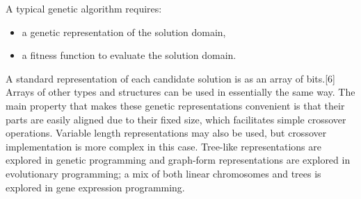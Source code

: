 \documentclass[a4paper, 12pt]{article}
\begin{document}
A typical genetic algorithm requires:
\begin{itemize}
\item a genetic representation of the solution domain,
\item a fitness function to evaluate the solution domain.
\end{itemize}
A standard representation of each candidate solution is as an array of bits.[6] Arrays of other types and structures can be used in essentially the same way. The main property that makes these genetic representations convenient is that their parts are easily aligned due to their fixed size, which facilitates simple crossover operations. Variable length representations may also be used, but crossover implementation is more complex in this case. Tree-like representations are explored in genetic programming and graph-form representations are explored in evolutionary programming; a mix of both linear chromosomes and trees is explored in gene expression programming.
\end{document}
